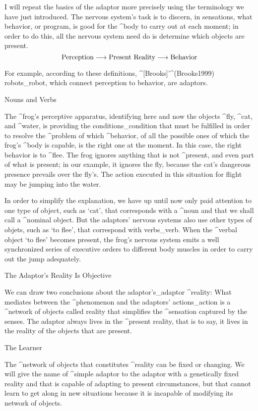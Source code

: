 I will repeat the basics of the adaptor more precisely using the
terminology we have just introduced. The nervous system's task is to
discern, in sensations, what behavior, or program, is good for the
^{body} to carry out at each moment; in order to do this, all the
nervous system need do is determine which objects are present.
$$\hbox{Perception} \longrightarrow \hbox{Present Reality}
   \longrightarrow \hbox{Behavior}$$

For example, according to these definitions, ^[Brooks]'^(Brooks1999)
robots_{robot}, which connect perception to behavior, are adaptors.


\Section Nouns and Verbs

The ^{frog}'s perceptive apparatus, identifying here and now the objects
^{fly}, ^{cat}, and ^{water}, is providing the conditions_{condition}
that must be fulfilled in order to resolve the ^{problem} of which
^{behavior}, of all the possible ones of which the frog's ^{body} is
capable, is the right one at the moment. In this case, the right
behavior is to ^{flee}. The frog ignores anything that is not
^{present}, and even part of what is present; in our example, it ignores
the fly, because the cat's dangerous presence prevails over the fly's.
The action executed in this situation for flight may be jumping into the
water.

In order to simplify the explanation, we have up until now only paid
attention to one type of object, such as `cat', that corresponds with a
^{noun} and that we shall call a ^{nominal object}. But the adaptors'
nervous systems also use other types of objets, such as `to flee', that
correspond with verbs_{verb}. When the ^{verbal object} `to flee'
becomes present, the frog's nervous system emits a well synchronized
series of executive orders to different body muscles in order to carry
out the jump adequately.


\Section The Adaptor's Reality Is Objective

We can draw two conclusions about the adaptor's_{adaptor} ^{reality}:
\beginpoints
\point What mediates between the ^{phenomenon} and the adaptors'
actions_{action} is a ^{network of objects} called reality that
simplifies the ^{sensation} captured by the senses.
\point The adaptor always lives in the ^{present} reality, that is to
say, it lives in the reality of the objects that are present.
\endpoints


\Section The Learner

The ^{network of objects} that constitutes ^{reality} can be fixed or
changing. We will give the name of ^{simple adaptor} to the adaptor with
a genetically fixed reality and that is capable of adapting to present
circumstances, but that cannot learn to get along in new situations
because it is incapable of modifying its network of objects.

